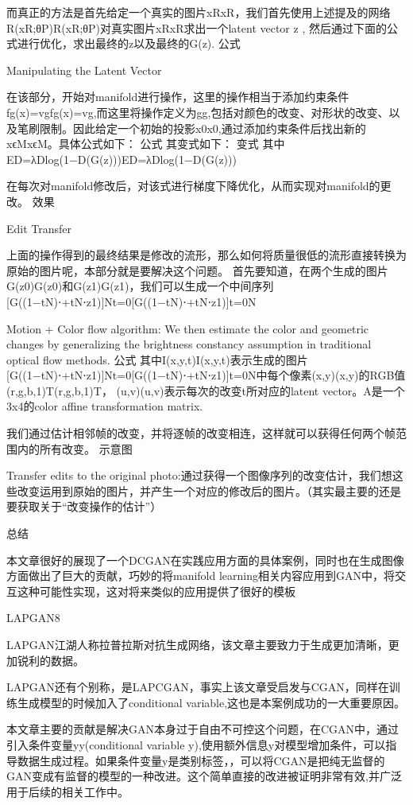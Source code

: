 而真正的方法是首先给定一个真实的图片xRxR，我们首先使用上述提及的网络R(xR;θP)R(xR;θP)对真实图片xRxR求出一个latent vector z , 然后通过下面的公式进行优化，求出最终的z以及最终的G(z). 公式

Manipulating the Latent Vector

在该部分，开始对manifold进行操作，这里的操作相当于添加约束条件fg(x)=vgfg(x)=vg,而这里将操作定义为gg,包括对颜色的改变、对形状的改变、以及笔刷限制。因此给定一个初始的投影x0x0,通过添加约束条件后找出新的xϵMxϵM。具体公式如下： 公式 其变式如下： 变式 其中ED=λDlog(1−D(G(z)))ED=λDlog(1−D(G(z)))

在每次对manifold修改后，对该式进行梯度下降优化，从而实现对manifold的更改。 效果

Edit Transfer

上面的操作得到的最终结果是修改的流形，那么如何将质量很低的流形直接转换为原始的图片呢，本部分就是要解决这个问题。 首先要知道，在两个生成的图片G(z0)G(z0)和G(z1)G(z1)，我们可以生成一个中间序列[G((1−tN)⋅+tN⋅z1)]Nt=0[G((1−tN)⋅+tN⋅z1)]t=0N

Motion + Color flow algorithm: We then estimate the color and geometric changes by generalizing the brightness constancy assumption in traditional optical flow methods. 公式 其中I(x,y,t)I(x,y,t)表示生成的图片[G((1−tN)⋅+tN⋅z1)]Nt=0[G((1−tN)⋅+tN⋅z1)]t=0N中每个像素(x,y)(x,y)的RGB值(r,g,b,1)T(r,g,b,1)T， (u,v)(u,v)表示每次的改变t所对应的latent vector。A是一个3x4的color affine transformation matrix.

我们通过估计相邻帧的改变，并将逐帧的改变相连，这样就可以获得任何两个帧范围内的所有改变。 示意图

Transfer edits to the original photo:通过获得一个图像序列的改变估计，我们想这些改变运用到原始的图片，并产生一个对应的修改后的图片。（其实最主要的还是要获取关于“改变操作的估计”）

总结

本文章很好的展现了一个DCGAN在实践应用方面的具体案例，同时也在生成图像方面做出了巨大的贡献，巧妙的将manifold learning相关内容应用到GAN中，将交互这种可能性实现，这对将来类似的应用提供了很好的模板

LAPGAN8

LAPGAN江湖人称拉普拉斯对抗生成网络，该文章主要致力于生成更加清晰，更加锐利的数据。

LAPGAN还有个别称，是LAPCGAN，事实上该文章受启发与CGAN，同样在训练生成模型的时候加入了conditional variable,这也是本案例成功的一大重要原因。

本文章主要的贡献是解决GAN本身过于自由不可控这个问题，在CGAN中，通过引入条件变量yy(conditional variable y),使用额外信息y对模型增加条件，可以指导数据生成过程。如果条件变量y是类别标签，，可以将CGAN是把纯无监督的GAN变成有监督的模型的一种改进。这个简单直接的改进被证明非常有效,并广泛用于后续的相关工作中。

